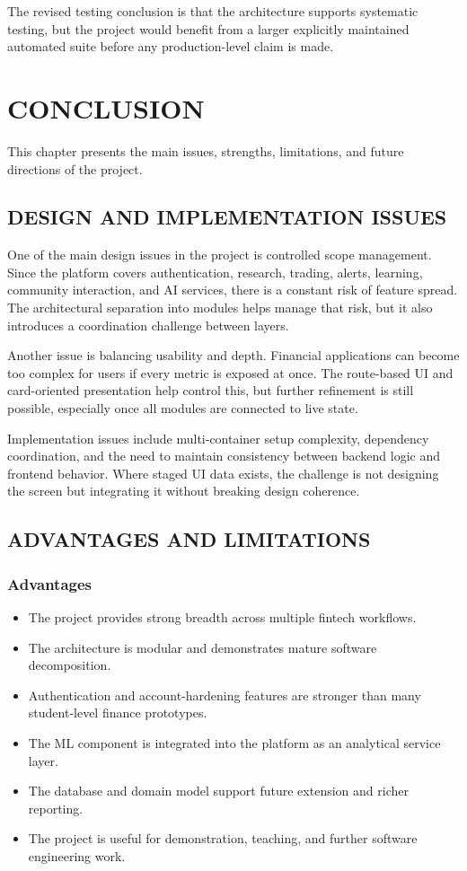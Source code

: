 \documentclass[12pt,a4paper]{report}
\begin{document}
The revised testing conclusion is that the architecture supports systematic testing, but the project would benefit from a larger explicitly maintained automated suite before any production-level claim is made.

\chapter{CONCLUSION}
This chapter presents the main issues, strengths, limitations, and future directions of the project.

\section{DESIGN AND IMPLEMENTATION ISSUES}
One of the main design issues in the project is controlled scope management. Since the platform covers authentication, research, trading, alerts, learning, community interaction, and AI services, there is a constant risk of feature spread. The architectural separation into modules helps manage that risk, but it also introduces a coordination challenge between layers.

Another issue is balancing usability and depth. Financial applications can become too complex for users if every metric is exposed at once. The route-based UI and card-oriented presentation help control this, but further refinement is still possible, especially once all modules are connected to live state.

Implementation issues include multi-container setup complexity, dependency coordination, and the need to maintain consistency between backend logic and frontend behavior. Where staged UI data exists, the challenge is not designing the screen but integrating it without breaking design coherence.

\section{ADVANTAGES AND LIMITATIONS}
\subsection{Advantages}
\begin{itemize}
\item The project provides strong breadth across multiple fintech workflows.
\item The architecture is modular and demonstrates mature software decomposition.
\item Authentication and account-hardening features are stronger than many student-level finance prototypes.
\item The ML component is integrated into the platform as an analytical service layer.
\item The database and domain model support future extension and richer reporting.
\item The project is useful for demonstration, teaching, and further software engineering work.
\end{itemize}
\end{document}
